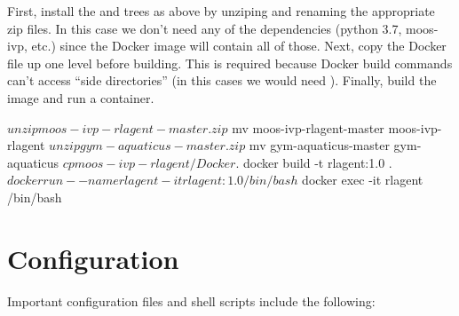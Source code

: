 \documentclass[onecolumn,letterpaper,11pt]{article}
\begin{document}
First, install the  and 
trees as above by unziping and renaming the appropriate zip files. In
this case we don't need any of the dependencies (python 3.7, moos-ivp,
etc.) since the Docker image will contain all of those. Next, copy the
Docker file up one level before building.  This is required because
Docker build commands can't access ``side directories'' (in this cases
we would need ). Finally, build the image and run a
container.

\begin{consoleverb}
$ unzip moos-ivp-rlagent-master.zip
$ mv moos-ivp-rlagent-master moos-ivp-rlagent
$ unzip gym-aquaticus-master.zip
$ mv gym-aquaticus-master gym-aquaticus
$ cp moos-ivp-rlagent/Docker .
$ docker build -t rlagent:1.0 .
$ docker run --name rlagent -it rlagent:1.0 /bin/bash
$ docker exec -it rlagent /bin/bash
\end{consoleverb}
\vspace{11pt}


\section{Configuration}

Important configuration files and shell scripts include the following:
\end{document}
